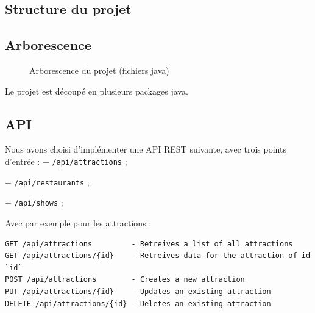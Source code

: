 \documentclass[a4paper, 12pt, twoside]{article}
\begin{document}
\begin{indt}{\section{Structure du projet}}
\begin{indt}{\subsection{Arborescence}}
\begin{figure}[H]
                \caption{Arborescence du projet (fichiers java)}
            \end{figure}

            Le projet est découpé en plusieurs packages java.
        \end{indt} %

        \begin{indt}{\subsection{API}} %
            \begin{indt}{Nous avons choisi d'implémenter une API REST suivante, avec trois points d'entrée :}
                $-$ \texttt{/api/attractions} ;

                $-$ \texttt{/api/restaurants} ;

                $-$ \texttt{/api/shows} ;
            \end{indt}

            Avec par exemple pour les attractions :

            \begin{lstlisting}[xleftmargin=60pt]
GET /api/attractions         - Retreives a list of all attractions
GET /api/attractions/{id}    - Retreives data for the attraction of id `id`
POST /api/attractions        - Creates a new attraction
PUT /api/attractions/{id}    - Updates an existing attraction
DELETE /api/attractions/{id} - Deletes an existing attraction \end{lstlisting}
        \end{indt} %
    \end{indt} %
\end{document}

